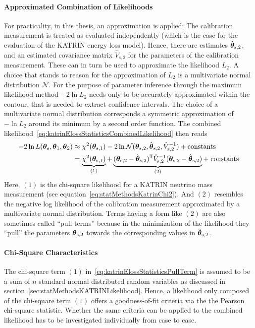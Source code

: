 \paragraph{Approximated Combination of Likelihoods}
For practicality, in this thesis, an approximation is applied: The calibration measurement is treated as evaluated independently (which is the case for the evaluation of the KATRIN energy loss model). Hence, there are estimates $\hat{\boldsymbol{\mathbf{\theta}}}_\mathrm{s,2}$, and an estimated covariance matrix $\hat{V}_\mathrm{s,2}$ for the parameters of the calibration measurement. These can in turn be used to approximate the likelihood $L_2$. A choice that stands to reason for the approximation of $L_2$ is a multivariate normal distribution $\mathcal{N}$. For the purpose of parameter inference through the maximum likelihood method $-2\ln L_2$ needs only to be accurately approximated within the contour, that is needed to extract confidence intervals. The choice of a multivariate normal distribution corresponds a symmetric approximation of $-\ln L_2$ around its minimum by a second order function. The combined likelihood~\eqref{eq:katrinElossStatisticsCombinedLikelihood} then reads
\begin{equation}
\begin{split}
\label{eq:katrinElossStatisticsPullTerm}
-2\ln L(\paramVecShared, \paramVec_1, \paramVec_2) &\approx
\chi^2(\paramVecSOne) 
-2\ln \mathcal{N}(\paramVecSTwo, \hat{\paramVec}_\mathrm{s,2}, \hat{V}_\mathrm{s,2}^{-1}) +
\mathrm{ constants}\\ &=
\underbrace{
	\chi^2(\paramVecSOne)
	\vphantom{(\paramVecSTwo - \hat{\paramVec}_\mathrm{s,2})^{\mathsf{T}}}
}_{(1)}
+
\underbrace{
	(\paramVec_\mathrm{s,2} - \hat{\paramVec}_\mathrm{s,2})^{\mathsf{T}}
	\hat{V}_\mathrm{s,2}^{-1}
	(\paramVec_\mathrm{s,2} - \hat{\paramVec}_\mathrm{s,2})
}_{(2)} +\; 
\mathrm{ constants}
\end{split}
\end{equation}
Here, $(1)$ is the chi-square likelihood for a KATRIN neutrino mass measurement (see equation~\ref{eq:statMethodsKatrinChi2}). And $(2)$ resembles the negative log likelihood of the calibration measurement approximated by a multivariate normal distribution. Terms having a form like $(2)$ are also sometimes called ``pull terms'' because in the minimization of the likelihood they ``pull'' the parameters $\boldsymbol{\mathbf{\theta}}_\mathrm{s,2}$ towards the corresponding values in $\hat{\boldsymbol{\mathbf{\theta}}}_\mathrm{s,2}$.

\paragraph{Chi-Square Characteristics}
The chi-square term $(1)$ in~\eqref{eq:katrinElossStatisticsPullTerm} is assumed to be a sum of $n$ standard normal distributed random variables as discussed in section~\ref{sec:statMethodsKATRINLikelihood}. Hence, a likelihood only composed of the chi-square term $(1)$ offers a goodness-of-fit criteria via the the Pearson chi-square statistic. Whether the same criteria can be applied to the combined likelihood has to be investigated individually from case to case.

